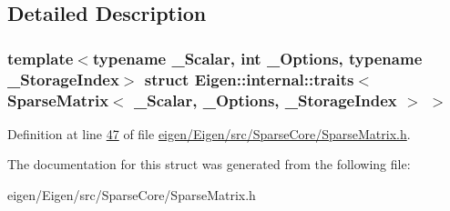 \subsection{Detailed Description}
\subsubsection*{template$<$typename \+\_\+\+Scalar, int \+\_\+\+Options, typename \+\_\+\+Storage\+Index$>$\newline
struct Eigen\+::internal\+::traits$<$ Sparse\+Matrix$<$ \+\_\+\+Scalar, \+\_\+\+Options, \+\_\+\+Storage\+Index $>$ $>$}



Definition at line \hyperlink{eigen_2_eigen_2src_2_sparse_core_2_sparse_matrix_8h_source_l00047}{47} of file \hyperlink{eigen_2_eigen_2src_2_sparse_core_2_sparse_matrix_8h_source}{eigen/\+Eigen/src/\+Sparse\+Core/\+Sparse\+Matrix.\+h}.



The documentation for this struct was generated from the following file\+:\begin{DoxyCompactItemize}
\item 
eigen/\+Eigen/src/\+Sparse\+Core/\+Sparse\+Matrix.\+h\end{DoxyCompactItemize}
